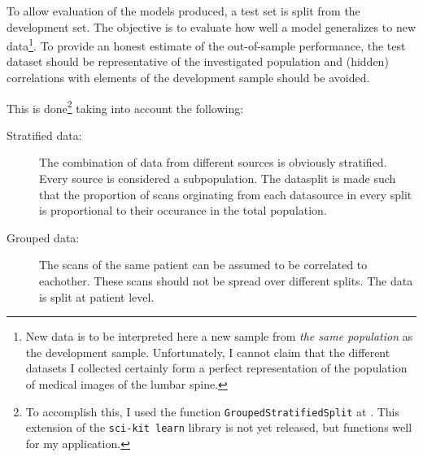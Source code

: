To allow evaluation of the models produced, a test set is split from the development set.
The objective is to evaluate how well a model generalizes to new data\footnote{
    New data is to be interpreted here a new sample from \textit{the same population} as the development sample.
    Unfortunately, I cannot claim that the different datasets I collected certainly form a perfect representation of the population of medical images of the lumbar spine.}. 
To provide an honest estimate of the out-of-sample performance, the test dataset should be representative of the investigated population and (hidden) correlations with elements of the development sample should be avoided.

This is done\footnote{To accomplish this, I used the function \texttt{GroupedStratifiedSplit} at . This extension of the \texttt{sci-kit learn} library is not yet released, but functions well for my application.} taking into account the following:
\begin{description}
    \item[Stratified data:] The combination of data from different sources is obviously stratified. Every source is considered a subpopulation. The datasplit is made such that the proportion of scans orginating from each datasource in every split is proportional to their occurance in the total population.
    \item[Grouped data:] The scans of the same patient can be assumed to be correlated to eachother. These scans should not be spread over different splits. The data is split at patient level.
\end{description}

